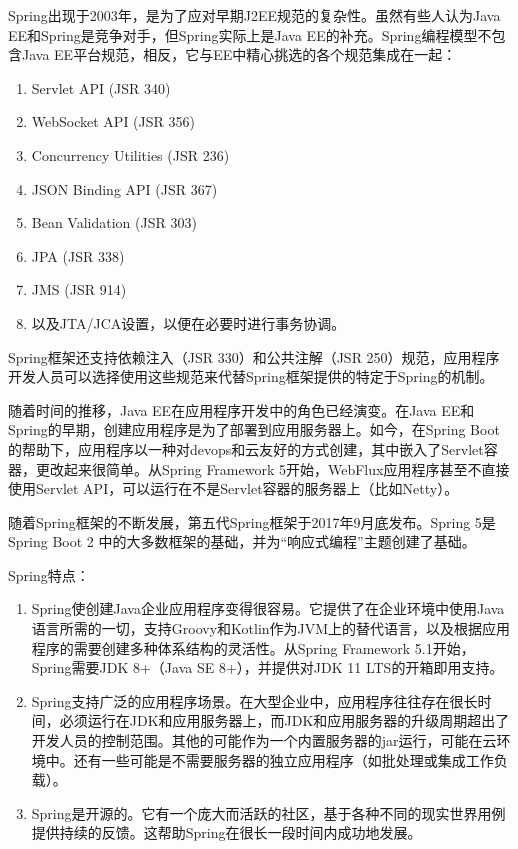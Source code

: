 Spring出现于2003年，是为了应对早期J2EE规范的复杂性。虽然有些人认为Java EE和Spring是竞争对手，但Spring实际上是Java EE的补充。Spring编程模型不包含Java EE平台规范，相反，它与EE中精心挑选的各个规范集成在一起：

\begin{enumerate}
  \item Servlet API (JSR 340)
  \item WebSocket API (JSR 356)
  \item Concurrency Utilities (JSR 236)
  \item JSON Binding API (JSR 367)
  \item Bean Validation (JSR 303)
  \item JPA (JSR 338)
  \item JMS (JSR 914)
  \item 以及JTA/JCA设置，以便在必要时进行事务协调。
\end{enumerate}

Spring框架还支持依赖注入（JSR 330）和公共注解（JSR 250）规范，应用程序开发人员可以选择使用这些规范来代替Spring框架提供的特定于Spring的机制。

随着时间的推移，Java EE在应用程序开发中的角色已经演变。在Java EE和Spring的早期，创建应用程序是为了部署到应用服务器上。如今，在Spring Boot的帮助下，应用程序以一种对devops和云友好的方式创建，其中嵌入了Servlet容器，更改起来很简单。从Spring Framework 5开始，WebFlux应用程序甚至不直接使用Servlet API，可以运行在不是Servlet容器的服务器上（比如Netty）。

随着Spring框架的不断发展，第五代Spring框架于2017年9月底发布。Spring 5是Spring Boot 2 中的大多数框架的基础，并为“响应式编程”主题创建了基础。

Spring特点：

\begin{enumerate}
  \item Spring使创建Java企业应用程序变得很容易。它提供了在企业环境中使用Java语言所需的一切，支持Groovy和Kotlin作为JVM上的替代语言，以及根据应用程序的需要创建多种体系结构的灵活性。从Spring Framework 5.1开始，Spring需要JDK 8+（Java SE 8+），并提供对JDK 11 LTS的开箱即用支持。
  \item Spring支持广泛的应用程序场景。在大型企业中，应用程序往往存在很长时间，必须运行在JDK和应用服务器上，而JDK和应用服务器的升级周期超出了开发人员的控制范围。其他的可能作为一个内置服务器的jar运行，可能在云环境中。还有一些可能是不需要服务器的独立应用程序（如批处理或集成工作负载）。
  \item Spring是开源的。它有一个庞大而活跃的社区，基于各种不同的现实世界用例提供持续的反馈。这帮助Spring在很长一段时间内成功地发展。
\end{enumerate}




